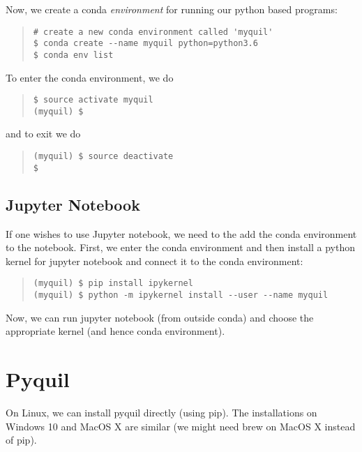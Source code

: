 \documentclass[12pt]{book}
\begin{document}
Now, we create a conda {\em environment} for running our python based programs:
\begin{quote}
\begin{verbatim}
# create a new conda environment called 'myquil'
$ conda create --name myquil python=python3.6
$ conda env list
\end{verbatim}
\end{quote}
To enter the conda environment, we do
\begin{quote}
\begin{verbatim} 
$ source activate myquil
(myquil) $
\end{verbatim}
\end{quote}
and to exit we do
\begin{quote}
\begin{verbatim} 
(myquil) $ source deactivate
$
\end{verbatim}
\end{quote}



\section{Jupyter Notebook}

If one wishes to use Jupyter notebook, we need to the add the conda environment
to the notebook. First, we enter the conda environment and then install a python kernel 
for jupyter notebook and connect it to the conda environment:
\begin{quote}
\begin{verbatim} 
(myquil) $ pip install ipykernel
(myquil) $ python -m ipykernel install --user --name myquil
\end{verbatim}
\end{quote}
Now, we can run jupyter notebook (from outside conda) and choose the appropriate 
kernel (and hence conda environment).



\chapter{Pyquil}

On Linux, we can install pyquil directly (using pip). 
The installations on Windows 10 and MacOS X are similar (we might need brew on MacOS X
instead of pip).
\end{document}
